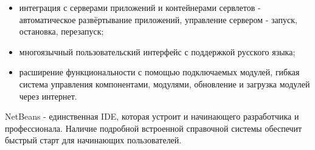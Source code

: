 \begin{itemize}
\item интеграция с серверами приложений и контейнерами сервлетов - автоматическое развёртывание приложений, управление сервером - запуск, остановка, перезапуск;
\item многоязычный пользовательский интерфейс с поддержкой русского языка;
\item расширение функциональности с помощью подключаемых модулей, гибкая система управления компонентами, модулями, обновление и загрузка модулей через интернет.

\end{itemize}

NetBeans - единственная IDE, которая устроит и начинающего разработчика и профессионала. Наличие подробной встроенной справочной системы обеспечит быстрый старт для начинающих пользователей.

